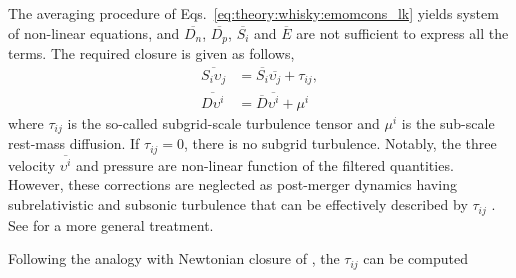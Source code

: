 The averaging procedure of Eqs.~\eqref{eq:theory:whisky:emomcons_lk} yields 
system of non-linear equations, and $\overline{D_{n}}$, $\overline{D_p}$, 
$\overline{S_i}$ and $\overline{E}$ 
are not sufficient to express all the terms.
The required closure is given as follows,
%
\begin{equation}
\begin{aligned}
\overline{S_i\upsilon_j} &= \overline{S_i}\overline{\upsilon_j} + \tau_{ij}, \\
\overline{D\upsilon^i} &= \overline{D}\overline{\upsilon^i} + \mu^i
\end{aligned}
\end{equation}
%
where $\tau_{ij}$ is the so-called subgrid-scale turbulence tensor \citep{Radice:2017zta} 
and $\mu^i$ is the sub-scale rest-mass diffusion.
If $\tau_{ij}=0$, there is no subgrid turbulence. 
%
%
%
%
Notably, the three velocity $\overline{\upsilon^i}$ and pressure are non-linear function of the filtered quantities.
However, these corrections are neglected as post-merger dynamics having subrelativistic and subsonic turbulence that 
can be effectively described by $\tau_{ij}$ \citep{Radice:2020ids}.
See \citet{Carrasco:2019uzl,Vigano:2020ouc} for a more general treatment.
%


Following the analogy with Newtonian closure of \citep{Smagorinsky:1963}, 
the $\tau_{ij}$ can be computed \citep{Radice:2017zta}

